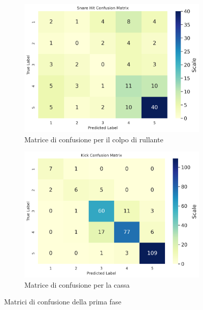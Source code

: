 \begin{figure}[h!]
	\begin{subfigure}{.5\linewidth}
		\includegraphics[width=\linewidth]{./immagini/second_classification/sn_hit_cm.png}
		\caption{Matrice di confusione per il colpo di rullante}
		\label{fig:cm_2c}
	\end{subfigure}\hfill
	\begin{subfigure}{.5\linewidth}
		\includegraphics[width=\linewidth]{./immagini/second_classification/kick_cm.png}
		\caption{Matrice di confusione per la cassa}
		\label{fig:cm_2d}
	\end{subfigure}
	\caption{Matrici di confusione della prima fase}
	\label{fig:cm_2}
\end{figure}

